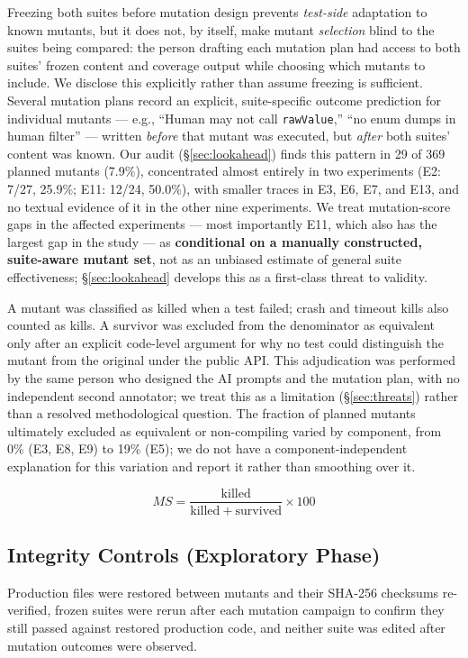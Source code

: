\documentclass[10pt,conference]{IEEEtran}
\begin{document}
Freezing both suites before mutation design prevents \emph{test-side} adaptation to known mutants, but it does not, by itself, make mutant \emph{selection} blind to the suites being compared: the person drafting each mutation plan had access to both suites' frozen content and coverage output while choosing which mutants to include. We disclose this explicitly rather than assume freezing is sufficient. Several mutation plans record an explicit, suite-specific outcome prediction for individual mutants — e.g., ``Human may not call \texttt{rawValue},'' ``no enum dumps in human filter'' — written \emph{before} that mutant was executed, but \emph{after} both suites' content was known. Our audit (\S\ref{sec:lookahead}) finds this pattern in 29 of 369 planned mutants (7.9\%), concentrated almost entirely in two experiments (E2: 7/27, 25.9\%; E11: 12/24, 50.0\%), with smaller traces in E3, E6, E7, and E13, and no textual evidence of it in the other nine experiments. We treat mutation-score gaps in the affected experiments — most importantly E11, which also has the largest gap in the study — as \textbf{conditional on a manually constructed, suite-aware mutant set}, not as an unbiased estimate of general suite effectiveness; \S\ref{sec:lookahead} develops this as a first-class threat to validity.

A mutant was classified as killed when a test failed; crash and timeout kills also counted as kills. A survivor was excluded from the denominator as equivalent only after an explicit code-level argument for why no test could distinguish the mutant from the original under the public API. This adjudication was performed by the same person who designed the AI prompts and the mutation plan, with no independent second annotator; we treat this as a limitation (\S\ref{sec:threats}) rather than a resolved methodological question. The fraction of planned mutants ultimately excluded as equivalent or non-compiling varied by component, from 0\% (E3, E8, E9) to 19\% (E5); we do not have a component-independent explanation for this variation and report it rather than smoothing over it.

\begin{equation}
MS = \frac{\mathrm{killed}}{\mathrm{killed}+\mathrm{survived}}\times100
\end{equation}

\subsection{Integrity Controls (Exploratory Phase)}
\label{sec:integrity}
Production files were restored between mutants and their SHA-256 checksums re-verified, frozen suites were rerun after each mutation campaign to confirm they still passed against restored production code, and neither suite was edited after mutation outcomes were observed.
\end{document}
